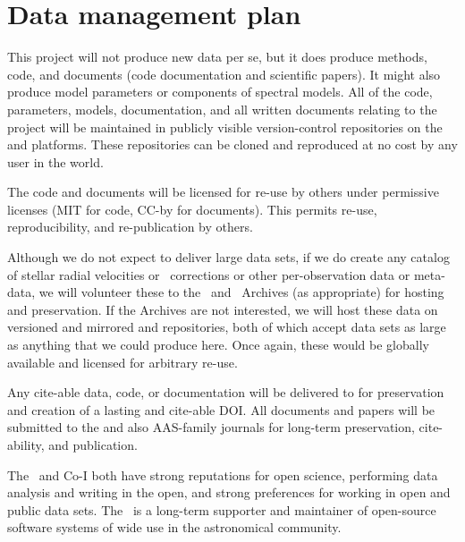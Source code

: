 \documentclass[12pt]{article}
\begin{document}
\sloppy\sloppypar\thispagestyle{empty}

\section*{Data management plan}

This project will not produce new data per se, but it does produce
methods, code, and documents (code documentation and scientific
papers). It might also produce model parameters or components of
spectral models. All of the code, parameters, models, documentation,
and all written documents relating to the project will be maintained
in publicly visible version-control repositories on the
 and  platforms. These repositories
can be cloned and reproduced at no cost by any user in the world.

The code and documents will be licensed for re-use by others under
permissive licenses (MIT for code, CC-by for documents). This permits
re-use, reproducibility, and re-publication by others.

Although we do not expect to deliver large data sets, if we do create
any catalog of stellar radial velocities or \RV\ corrections or other
per-observation data or meta-data, we will volunteer these to the
\HARPS\ and \ESPRESSO\ Archives (as appropriate) for hosting and
preservation. If the Archives are not interested, we will host these
data on versioned and mirrored  and 
repositories, both of which accept data sets as large as anything that
we could produce here. Once again, these would be globally available
and licensed for arbitrary re-use.

Any cite-able data, code, or documentation will be delivered to
 for preservation and creation of a lasting and
cite-able DOI. All documents and papers will be submitted to the
 and also AAS-family journals for long-term
preservation, cite-ability, and publication.

The \PI\ and Co-I both have strong reputations for open science,
performing data analysis and writing in the open, and strong
preferences for working in open and public data sets. The \PI\ is a
long-term supporter and maintainer of open-source software systems of
wide use in the astronomical community.
\end{document}
